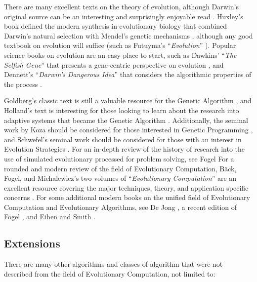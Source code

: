 \begin{bibunit}
There are many excellent texts on the theory of evolution, although Darwin's original source can be an interesting and surprisingly enjoyable read \cite{Darwin1859}. Huxley's book defined the modern synthesis in evolutionary biology that combined Darwin's natural selection with Mendel's genetic mechanisms \cite{Huxley1942}, although any good textbook on evolution will suffice (such as Futuyma's ``\emph{Evolution}'' \cite{Futuyma2009}). Popular science books on evolution are an easy place to start, such as Dawkins' ``\emph{The Selfish Gene}'' that presents a gene-centric perspective on evolution \cite{Dawkins1976}, and Dennett's ``\emph{Darwin's Dangerous Idea}'' that considers the algorithmic properties of the process \cite{Dennett1995}.

Goldberg's classic text is still a valuable resource for the Genetic Algorithm \cite{Goldberg1989}, and Holland's text is interesting for those looking to learn about the research into adaptive systems that became the Genetic Algorithm \cite{Holland1975}. Additionally, the seminal work by Koza should be considered for those interested in Genetic Programming \cite{Koza1992}, and Schwefel's seminal work should be considered for those with an interest in Evolution Strategies \cite{Schwefel1981}. For an in-depth review of the history of research into the use of simulated evolutionary processed for problem solving, see Fogel \cite{Fogel1998}
For a rounded and modern review of the field of Evolutionary Computation, B\"ack, Fogel, and Michalewicz's two volumes of ``\emph{Evolutionary Computation}'' are an excellent resource covering the major techniques, theory, and application specific concerns \cite{Baeck2000, Baeck2000a}.
For some additional modern books on the unified field of Evolutionary Computation and Evolutionary Algorithms, see De Jong \cite{Jong2006}, a recent edition of Fogel \cite{Fogel1995}, and Eiben and Smith \cite{Eiben2003}.

% 
% 
\subsection{Extensions}
There are many other algorithms and classes of algorithm that were not described from the field of Evolutionary Computation, not limited to:


\end{bibunit}
